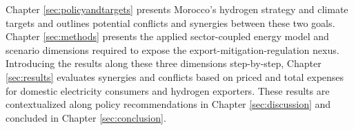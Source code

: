 Chapter \ref{sec:policyandtargets} presents Morocco's hydrogen strategy and climate targets and outlines potential conflicts and synergies between these two goals. Chapter \ref{sec:methods} presents the applied sector-coupled energy model and scenario dimensions required to expose the export-mitigation-regulation nexus. Introducing the results along these three dimensions step-by-step, Chapter \ref{sec:results} evaluates synergies and conflicts based on priced and total expenses for domestic electricity consumers and hydrogen exporters. These results are contextualized along policy recommendations in Chapter \ref{sec:discussion} and concluded in Chapter \ref{sec:conclusion}.



%


